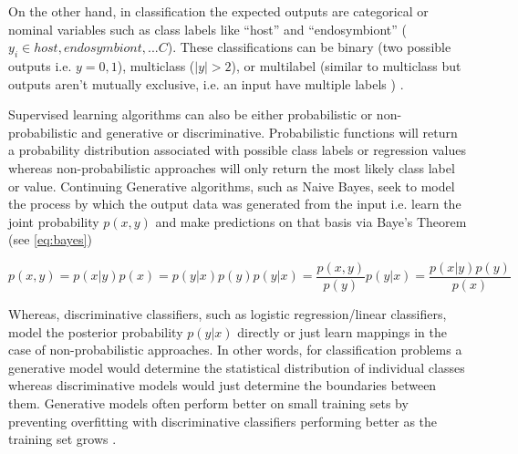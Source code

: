 On the other hand, in classification the expected outputs are 
categorical or nominal variables such as class labels like ``host'' and ``endosymbiont'' 
(\(y_{i} \in {host, endosymbiont, ... C}\)).  These classifications can be binary (two possible outputs i.e. 
\(y={0,1}\)), multiclass (\(\left\vert{{y}}\right\vert > 2\)),
or multilabel (similar to multiclass but outputs aren't mutually exclusive, i.e. an input have multiple labels
) \citep{Murphy2012}. 

Supervised learning algorithms can also be either probabilistic or non-probabilistic and generative or 
discriminative.
Probabilistic functions will return a probability distribution associated with possible class labels or
regression values whereas non-probabilistic approaches will only return the most likely class label or value.
Continuing 
Generative algorithms, such as Naive Bayes, seek to model the process by which the output data was generated %
from the input i.e. learn the joint probability \(p(x,y)\) and make predictions on that basis via Baye's Theorem (see \ref{eq:bayes}) %

\[
    p(x,y) = p(x|y)p(x) = p(y|x)p(y) %
    p(y|x) = \frac{p(x,y)}{p(y)} %
    p(y|x) = \frac{p(x|y)p(y)}{p(x)}
    \label{eq:bayes}
\]

Whereas, discriminative classifiers, such as logistic regression/linear classifiers,
model the posterior probability \(p(y|x)\) directly or just learn mappings in the case of non-probabilistic approaches. %
In other words, for classification problems a generative model would determine the statistical distribution of 
individual classes whereas discriminative models would just determine the boundaries between them.
Generative models often perform better on small training sets by preventing overfitting with discriminative
classifiers performing better as the training set grows \citep{Ng2002}. %

